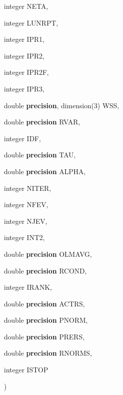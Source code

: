 {\begin{DoxyParamCaption}
\item[{integer}]{N\+E\+T\+A, }
\item[{integer}]{L\+U\+N\+R\+P\+T, }
\item[{integer}]{I\+P\+R1, }
\item[{integer}]{I\+P\+R2, }
\item[{integer}]{I\+P\+R2\+F, }
\item[{integer}]{I\+P\+R3, }
\item[{double {\bf precision}, dimension(3)}]{W\+S\+S, }
\item[{double {\bf precision}}]{R\+V\+A\+R, }
\item[{integer}]{I\+D\+F, }
\item[{double {\bf precision}}]{T\+A\+U, }
\item[{double {\bf precision}}]{A\+L\+P\+H\+A, }
\item[{integer}]{N\+I\+T\+E\+R, }
\item[{integer}]{N\+F\+E\+V, }
\item[{integer}]{N\+J\+E\+V, }
\item[{integer}]{I\+N\+T2, }
\item[{double {\bf precision}}]{O\+L\+M\+A\+V\+G, }
\item[{double {\bf precision}}]{R\+C\+O\+N\+D, }
\item[{integer}]{I\+R\+A\+N\+K, }
\item[{double {\bf precision}}]{A\+C\+T\+R\+S, }
\item[{double {\bf precision}}]{P\+N\+O\+R\+M, }
\item[{double {\bf precision}}]{P\+R\+E\+R\+S, }
\item[{double {\bf precision}}]{R\+N\+O\+R\+M\+S, }
\item[{integer}]{I\+S\+T\+O\+P}
\end{DoxyParamCaption}
)}\label{d__odr_8f_a9af23e7866b0bc36436747a3d4580edb}
\hypertarget{d__odr_8f_a1f0ea3bc3d08f38b7a017d86874315d0}{}
